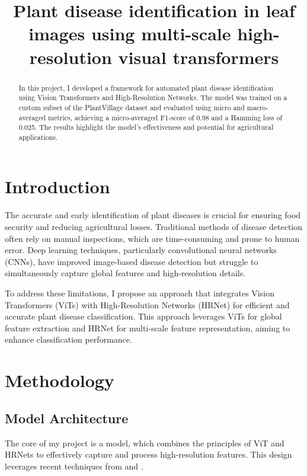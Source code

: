 \documentclass[conference]{IEEEtran}
\begin{document}
\title{Plant disease identification in leaf images using multi-scale high-resolution  visual transformers}

\author{
}

\maketitle
\begin{abstract}
In this project, I developed a framework for automated plant disease identification using Vision Transformers and High-Resolution Networks. The model was trained on a custom subset of the PlantVillage dataset and evaluated using micro and macro-averaged metrics, achieving a micro-averaged F1-score of 0.98 and a Hamming loss of 0.025. The results highlight the model's effectiveness and potential for agricultural applications.
\end{abstract}

\section{Introduction}
The accurate and early identification of plant diseases is crucial for ensuring food security and reducing agricultural losses. Traditional methods of disease detection often rely on manual inspections, which are time-consuming and prone to human error. Deep learning techniques, particularly convolutional neural networks (CNNs), have improved image-based disease detection but struggle to simultaneously capture global features and high-resolution details.

To address these limitations, I propose an approach that integrates Vision Transformers (ViTs) with High-Resolution Networks (HRNet) for efficient and accurate plant disease classification. This approach leverages ViTs for global feature extraction and HRNet for multi-scale feature representation, aiming to enhance classification performance.

\section{Methodology}
\subsection{Model Architecture}
The core of my project is a model, which combines the principles of ViT and HRNets to effectively capture and process high-resolution features. This design leverages recent techniques from \cite{wang2020} and \cite{gu2021}.
\end{document}
